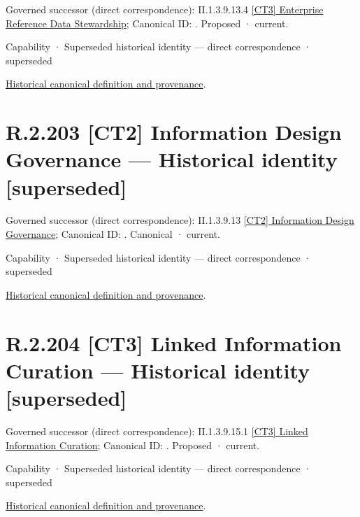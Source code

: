 {\small Governed successor (direct correspondence): II.1.3.9.13.4 \hyperref[element:971d4b079ad24e89b70a8ed8dec0c8bf]{[CT3] Enterprise Reference Data Stewardship}; Canonical ID: \texttt{}. Proposed · current.}\par
\label{element:fd9f3239fdb64ea687825b66bb4d1f17}
{\small Capability · Superseded historical identity — direct correspondence · superseded}\par
\href{../../../../continuum/strategy/capability/fd9f3239fdb64ea687825b66bb4d1f17.md}{Historical canonical definition and provenance}.\par
\section*{R.2.203 [CT2] Information Design Governance — Historical identity [superseded]}
\label{navigation:R.2.203}

{\small Governed successor (direct correspondence): II.1.3.9.13 \hyperref[element:f39ed9ebcc724857a4bf7a2b8e045c7a]{[CT2] Information Design Governance}; Canonical ID: \texttt{}. Canonical · current.}\par
\label{element:0bdd7f8c0cd74d9fabc49801af037fc2}
{\small Capability · Superseded historical identity — direct correspondence · superseded}\par
\href{../../../../continuum/strategy/capability/0bdd7f8c0cd74d9fabc49801af037fc2.md}{Historical canonical definition and provenance}.\par
\section*{R.2.204 [CT3] Linked Information Curation — Historical identity [superseded]}
\label{navigation:R.2.204}

{\small Governed successor (direct correspondence): II.1.3.9.15.1 \hyperref[element:5edb2a8b5ee54ddda8104d1fab323a94]{[CT3] Linked Information Curation}; Canonical ID: \texttt{}. Proposed · current.}\par
\label{element:9d0925bb39664a5985cacf3cea7442d1}
{\small Capability · Superseded historical identity — direct correspondence · superseded}\par
\href{../../../../continuum/strategy/capability/9d0925bb39664a5985cacf3cea7442d1.md}{Historical canonical definition and provenance}.\par
